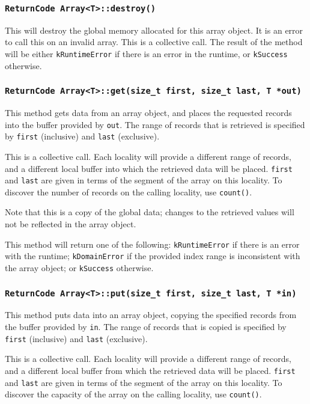 \subsubsection{\texttt{ReturnCode Array<T>::destroy()}}

This will destroy the global memory allocated for this array object. It is
an error to call this on an invalid array. This is a collective call. The
result of the method will be either \texttt{kRuntimeError} if there is an error
in the runtime, or \texttt{kSuccess} otherwise.

\subsubsection{\texttt{ReturnCode Array<T>::get(size\_t first, size\_t last, T *out)}}
This method gets data from an array object, and places the requested
records into the buffer provided by \texttt{out}. The range of records that is
retrieved is specified by \texttt{first} (inclusive) and \texttt{last}
(exclusive).

This is a collective call. Each locality will provide a different range of
records, and a different local buffer into which the retrieved data will be
placed. \texttt{first} and \texttt{last} are given in terms of the segment of
the array on this locality. To discover the number of records on the calling
locality, use \texttt{count()}.

Note that this is a copy of the global data; changes to the retrieved values
will not be reflected in the array object.

This method will return one of the following: \texttt{kRuntimeError} if there
is an error with the runtime; \texttt{kDomainError} if the provided index range
is inconsistent with the array object; or \texttt{kSuccess} otherwise.

\subsubsection{\texttt{ReturnCode Array<T>::put(size\_t first, size\_t last, T *in)}}

This method puts data into an array object, copying the specified
records from the buffer provided by \texttt{in}. The range of records that is
copied is specified by \texttt{first} (inclusive) and \texttt{last} (exclusive).

This is a collective call. Each locality will provide a different range of
records, and a different local buffer from which the retrieved data will be
placed. \texttt{first} and \texttt{last} are given in terms of the segment of
the array on this locality. To discover the capacity of the array on the
calling locality, use \texttt{count()}.

